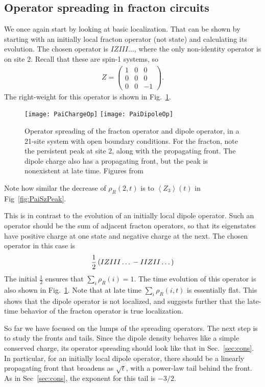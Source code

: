\documentclass[a4paper,11pt]{article}
\renewcommand{\th}[1]{\frac{1}{#1}}
\newcommand{\ex}[1]{\left\langle #1 \right\rangle}
\newcommand{\note}[1]{{\color{red}{#1}}}
\begin{document}
\subsection{Operator spreading in fracton circuits} \label{sub:fracopsp}

We once again start by looking at basic localization. That can be shown by starting with an initially local fracton operator (not state) and calculating its evolution. The chosen operator is $IZIII\dots$, where the only non-identity operator is on site 2. Recall that these are spin-1 systems, so 
\begin{align}
Z = \begin{pmatrix} 1 & 0 & 0 \\ 0 & 0 & 0 \\ 0 & 0 & -1 \end{pmatrix}.
\end{align}
The right-weight for this operator is shown in Fig.~\ref{fig:PaiChargeOp}.
\begin{figure}
	\centering
	\texttt{[image: PaiChargeOp]}
	\texttt{[image: PaiDipoleOp]}
	\caption{Operator spreading of the fracton operator and dipole operator, in a 21-site system with open boundary conditions. For the fracton, note the persistent peak at site 2, along with the propagating front. The dipole charge also has a propagating front, but the peak is nonexistent at late time. Figures from~\cite{PaiFracton}}
	\label{fig:PaiChargeOp}
\end{figure}
Note how similar the decrease of $\rho_R(2,t)$ is to $\ex{Z_3}(t)$ in Fig~\ref{fig:PaiSzPeak}.

This is in contrast to the evolution of an initially local dipole operator. Such an operator should be the sum of adjacent fracton operators, so that its eigenstates have positive charge at one state and negative charge at the next. The chosen operator in this case is 
\begin{align}
\th{2}\left(IZIII\dots \vphantom{j}-IIZII\dots\right)
\end{align}
\note{Shouldn't it be $\th{\sqrt{2}}$?} The initial $\th{2}$ ensures that $\sum_i\rho_R(i)=1$. The time evolution of this operator is also shown in Fig.~\ref{fig:PaiChargeOp}. Note that at late time $\sum_i\rho_R(i, t)$ is essentially flat. This shows that the dipole operator is not localized, and suggests further that the late-time behavior of the fracton operator is true localization. 

So far we have focused on the lumps of the spreading operators. The next step is to study the fronts and tails. Since the dipole density behaves like a simple conserved charge, its operator spreading should look like that in Sec.~\ref{sec:cons}. In particular, for an initially local dipole operator, there should be a linearly propagating front that broadens as $\sqrt{t}$, with a power-law tail behind the front. As in Sec~\ref{sec:cons}, the exponent for this tail is $-3/2$.
\end{document}
